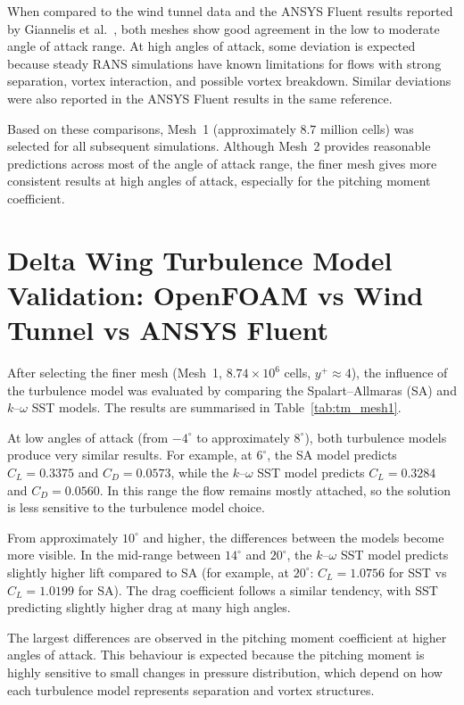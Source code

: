 When compared to the wind tunnel data and the ANSYS Fluent results reported by Giannelis et al.~\cite{Giannelis2023SSAMGen5}, both meshes show good agreement in the low to moderate angle of attack range. At high angles of attack, some deviation is expected because steady RANS simulations have known limitations for flows with strong separation, vortex interaction, and possible vortex breakdown. Similar deviations were also reported in the ANSYS Fluent results in the same reference.

Based on these comparisons, Mesh~1 (approximately $8.7$ million cells) was selected for all subsequent simulations. Although Mesh~2 provides reasonable predictions across most of the angle of attack range, the finer mesh gives more consistent results at high angles of attack, especially for the pitching moment coefficient.

\section{Delta Wing Turbulence Model Validation: OpenFOAM vs Wind Tunnel vs ANSYS Fluent}


After selecting the finer mesh (Mesh~1, $8.74\times 10^{6}$ cells, $y^{+}\approx 4$), the influence of the turbulence model was evaluated by comparing the Spalart--Allmaras (SA) and $k$--$\omega$ SST models. The results are summarised in Table~\ref{tab:tm_mesh1}.

At low angles of attack (from $-4^{\circ}$ to approximately $8^{\circ}$), both turbulence models produce very similar results. For example, at $6^{\circ}$, the SA model predicts $C_{L}=0.3375$ and $C_{D}=0.0573$, while the $k$--$\omega$ SST model predicts $C_{L}=0.3284$ and $C_{D}=0.0560$. In this range the flow remains mostly attached, so the solution is less sensitive to the turbulence model choice.

From approximately $10^{\circ}$ and higher, the differences between the models become more visible. In the mid-range between $14^{\circ}$ and $20^{\circ}$, the $k$--$\omega$ SST model predicts slightly higher lift compared to SA (for example, at $20^{\circ}$: $C_{L}=1.0756$ for SST vs $C_{L}=1.0199$ for SA). The drag coefficient follows a similar tendency, with SST predicting slightly higher drag at many high angles.

The largest differences are observed in the pitching moment coefficient at higher angles of attack. This behaviour is expected because the pitching moment is highly sensitive to small changes in pressure distribution, which depend on how each turbulence model represents separation and vortex structures.

